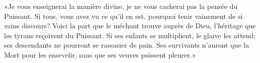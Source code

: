 «Je vous enseignerai la manière divine, je ne vous cacherai pas la pensée du Puissant.
Si tous, vous avez vu ce qu’il en est,
	pourquoi tenir vainement de si vains discours?
Voici la part que le méchant trouve auprès de Dieu,
	l’héritage que les tyrans reçoivent du Puissant.
Si ses enfants se multiplient, le glaive les attend;
	ses descendants ne pourront se rassasier de pain.
Ses survivants n’auront que la Mort pour les ensevelir,
	sans que ses veuves puissent pleurer.»